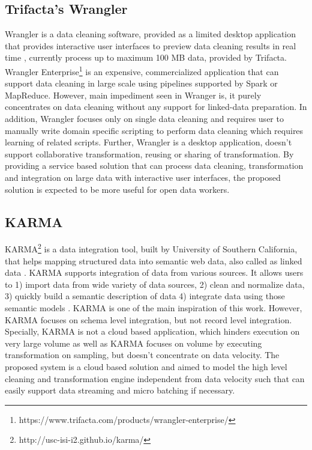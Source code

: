 \subsection{Trifacta's Wrangler}
Wrangler is a data cleaning software, provided as a limited desktop application that provides interactive user interfaces to preview data cleaning results in real time \cite{2011-wrangler} \cite{visualizationsandtransformationsinwrangling} \cite{Keim08visualanalytics:}, currently process up to maximum 100 MB data, provided by Trifacta. Wrangler Enterprise\footnote{https://www.trifacta.com/products/wrangler-enterprise/} is an expensive, commercialized application that can support data cleaning in large scale using pipelines supported by Spark or MapReduce. However, main impediment seen in Wranger is, it purely concentrates on data cleaning without any support for linked-data preparation. In addition, Wrangler focuses only on single data cleaning and requires user to manually write domain specific scripting to perform data cleaning which requires learning of related scripts. Further, Wrangler is a desktop application, doesn't support collaborative transformation, reusing or sharing of transformation. By providing a service based solution that can process data cleaning, transformation and integration on large data with interactive user interfaces, the proposed solution is expected to be more useful for open data workers. 
\subsection{KARMA}
KARMA\footnote{http://usc-isi-i2.github.io/karma/} is a data integration tool, built by University of Southern California, that helps mapping structured data into semantic web data, also called as linked data \cite{karma}. KARMA supports integration of data from various sources. It allows users to 1) import data from wide variety of data sources, 2) clean and normalize data, 3) quickly build a semantic description of data  4) integrate data using those semantic models \cite{knoblock15:aimag}. KARMA is one of the main inspiration of this work. However, KARMA focuses on schema level integration, but not record level integration. Specially, KARMA is not a cloud based application, which hinders execution on very large volume \cite{knoblock15:aimag} as well as KARMA focuses on volume by executing transformation on sampling, but doesn't concentrate on data velocity. The proposed system is a cloud based solution and aimed to model the high level cleaning and transformation engine independent from data velocity such that can easily support data streaming and micro batching if necessary. 
